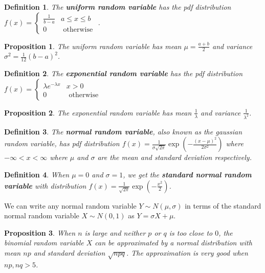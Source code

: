 \documentclass[14pt,twoside]{extreport}
\theoremstyle{dotless}
\newtheorem*{defn}{Definition}
\newtheorem*{prop}{Proposition} %
\begin{document}
\begin{defn}    
    The \textbf{uniform random variable} has the pdf distribution $f(x) = \begin{cases} \frac{1}{b-a} & a \leq x \leq b \\ 0 & \text { otherwise }\end{cases}$.
\end{defn}

\begin{prop}
The uniform random variable has mean $\mu = \frac{a + b}{2}$ and variance $\sigma^2 = \frac{1}{12} (b-a)^2$.
\end{prop}

\begin{defn}
    The \textbf{exponential random variable} has the pdf distribution $f(x) = \begin{cases} \lambda e^{-\lambda x} & x > 0 \\ 0 & \text{ otherwise } \end{cases}$
\end{defn}

\begin{prop}
The exponential random variable has mean $\frac{1}{\lambda}$ and variance $\frac{1}{\lambda^2}$.
\end{prop}

\begin{defn}
    The \textbf{normal random variable}, also known as the gaussian random variable, has pdf distribution $f(x) = \displaystyle \frac{1}{\sigma \sqrt{2 \pi}}  \exp\left(\displaystyle - \frac{(x-\mu)^2}{2 \sigma^2}\right)$ where $-\infty < x < \infty$ where $\mu$ and $\sigma$ are the mean and standard deviation respectively.
\end{defn}

\begin{defn}
When $\mu = 0$ and $\sigma = 1$, we get the \textbf{standard normal random variable} with distribution $f(x) = \displaystyle\frac{1}{\sqrt{2\pi}} \exp(-\frac{x^2}{2})$.
\end{defn}

We can write any normal random variable $Y \sim N(\mu, \sigma)$ in terms of the standard normal random variable $X \sim N(0,1)$ as $Y = \sigma X + \mu$.

\begin{prop}
    When $n$ is large and neither $p$ or $q$ is too close to $0$, the binomial random variable $X$ can be approximated by a normal distribution with mean $np$ and standard deviation $\sqrt{npq}$. The approximation is very good when $np, nq > 5$.
\end{prop}
\end{document}
